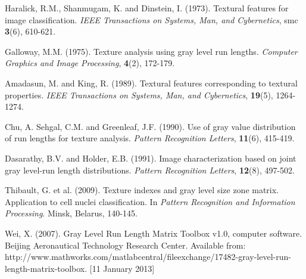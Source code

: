 \documentclass{article}
\begin{document}
\footnotesize
\begin{thebibliography}{99} %

	 Haralick, R.M., Shanmugam, K. and Dinstein, I. (1973).
			{Textural features for image classification}.
			{\em IEEE Transactions on Systems, Man, and Cybernetics}, smc \textbf{3}(6), 	
			610-621.	
			
	 Galloway, M.M. (1975).
			{Texture analysis using gray level run lengths}.
			{\em Computer Graphics and Image Processing}, \textbf{4}(2), 172-179.	
			
	 Amadasun, M. and King, R. (1989).
			{Textural features corresponding to textural properties}.
			{\em IEEE Transactions on Systems, Man, and Cybernetics}, \textbf{19}(5), 1264-1274. 
			
	 Chu, A. Sehgal, C.M. and Greenleaf, J.F. (1990).
			{Use of gray value distribution of run lengths for texture analysis}.
			{\em Pattern Recognition Letters}, \textbf{11}(6), 415-419.
			
	 Dasarathy, B.V. and Holder, E.B. (1991).
			{Image characterization based on joint gray level-run length distributions}.
			{\em Pattern Recognition Letters}, \textbf{12}(8), 497-502.
			
	 Thibault, G. et al. (2009).
			{Texture indexes and gray level size zone matrix. Application to cell nuclei 
			classification}. In {\em Pattern Recognition and Information Processing}. 
			Minsk, Belarus, 140-145.
			
	 Wei, X. (2007). 
			{Gray Level Run Length Matrix Toolbox v1.0, computer software}.
			{Beijing Aeronautical Technology Research Center}.
			{Available from: http://www.mathworks.com/matlabcentral/fileexchange/17482-gray-level-run-length-matrix-toolbox}. [11 January 2013]
			
\end{thebibliography}
\end{document}
